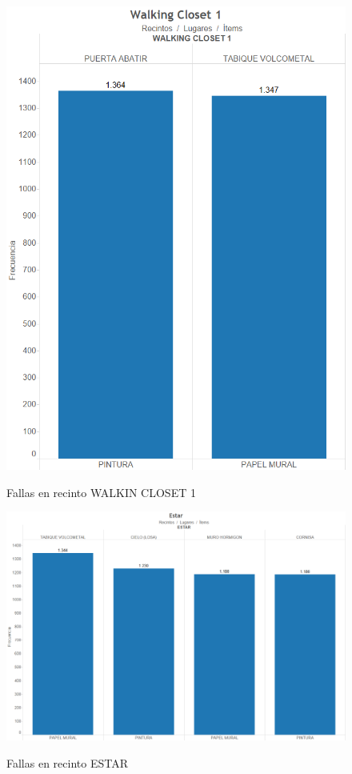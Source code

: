 \documentclass[letter,12pt,oneside]{report}
\begin{document}
\begin{figure}[H]
\begin{center}
\includegraphics[scale=0.5]{images/walking.png}
\caption{Fallas en recinto WALKIN CLOSET 1}
\label{}
\end{center}
\end{figure}

\begin{figure}[H]
\begin{center}
\includegraphics[scale=0.5]{images/estar.png}
\caption{Fallas en recinto ESTAR}
\label{}
\end{center}
\end{figure}
\end{document}
